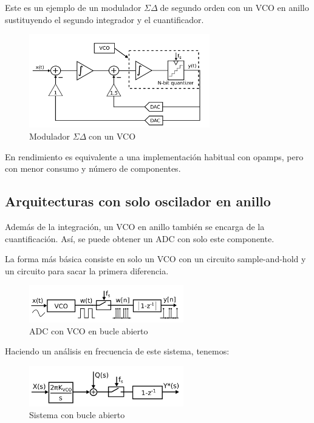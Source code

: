 \documentclass[12pt]{report} %
\newcommand{\sigmadelta}{$\Sigma\Delta\; $}
\begin{document}
	Este es un ejemplo de un modulador \sigmadelta de segundo orden con un VCO en anillo sustituyendo el segundo integrador y el cuantificador.
	\begin{figure}[H]
		\includegraphics[width=0.7\textwidth]{sd-with-vco.png}
		\caption[Modulador \sigmadelta con un VCO]{Modulador \sigmadelta con un VCO\protect\footnotemark}
		\label{fig:sd-with-vco.png}
	\end{figure}
	
	En rendimiento es equivalente a una implementación habitual con opamps, pero con menor consumo y número de componentes.
	
	\subsection{Arquitecturas con solo oscilador en anillo}
	
	Además de la integración, un VCO en anillo también se encarga de la cuantificación. Así, se puede obtener un ADC con solo este componente.
	
	La forma más básica consiste en solo un VCO con un circuito sample-and-hold y un circuito para sacar la primera diferencia.
	\begin{figure}[H]
		\includegraphics[width=0.6\textwidth]{vco-adc-open-loop.png}
		\caption[ADC con VCO en bucle abierto]{ADC con VCO en bucle abierto\protect\footnotemark}
		\label{fig:vco-adc-open-loop.png}
	\end{figure}
	
	Haciendo un análisis en frecuencia de este sistema, tenemos:
	\begin{figure}[H]
		\includegraphics[width=0.6\textwidth]{vco-adc-open-loop-lp.png}
		\caption[Sistema con bucle abierto]{Sistema con bucle abierto\protect\footnotemark}
		\label{fig:vco-adc-open-loop-lp.png}
	\end{figure}
	
\end{document}
